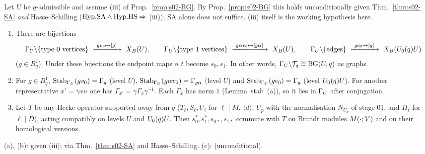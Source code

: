 \begin{proposition}\label{prop:s02-quot}
Let $U$ be $q$-admissible and assume (iii) of Prop.~\ref{prop:s02-BG}. By Prop.~\ref{prop:s02-BG} this holds
unconditionally given Thm.~\ref{thm:s02-SA} \emph{and} Hasse--Schilling ($\mathrm{Hyp.SA}\wedge\mathrm{Hyp.HS}\Rightarrow$ (iii)); SA alone does not suffice. (iii) itself is the working hypothesis here.
\begin{enumerate}[label=(\alph*)]
\item There are bijections
  \[\GU\backslash\{\text{type-}0\text{ vertices}\}\ \xrightarrow{\ gv_0\mapsto[g]\ }\ \XB{U},\qquad
    \GU\backslash\{\text{type-}1\text{ vertices}\}\ \xrightarrow{\ g\alpha v_0\mapsto[g\alpha]\ }\ \XB{U},\qquad
    \GU\backslash\{\text{edges}\}\ \xrightarrow{\ ge_0\mapsto[g]\ }\ \XB{\Uzero{q}U}\]
  ($g\in B^1_q$). Under these bijections the endpoint maps $o,t$ become $s_0,s_1$. In other words,
  $\Gamma_U\backslash\mathcal{T}_q\cong\mathrm{BG}(U,q)$ as graphs.
\item For $g\in B^1_q$, $\operatorname{Stab}_{\Gamma_U}(gv_0)=\Gamma_g$ (level $U$), $\operatorname{Stab}_{\Gamma_U}(g\alpha v_0)=\Gamma_{g\alpha}$
  (level $U$) and $\operatorname{Stab}_{\Gamma_U}(ge_0)=\Gamma_g$ (level $U_0(q)U$). For another representative
  $x'=\gamma xu$ one has $\Gamma_{x'}=\gamma\Gamma_x\gamma^{-1}$. Each $\Gamma_x$ has norm $1$
  (Lemma~stab~(a)), so it lies in $\Gamma_U$ after conjugation.
\item Let $T$ be any Hecke operator supported away from $q$ ($T_\ell,S_\ell,U_\ell$ for $\ell\mid M$,
  $\langle d\rangle$, $U_p$ with the normalisation $N_{U_p}$ of stage 01, and $\Pi_\ell$ for $\ell\mid D$),
  acting compatibly on levels $U$ and $U_0(q)U$. Then $s_0^*,s_1^*,s_{0*},s_{1*}$ commute with $T$ on
  Brandt modules $M(\cdot;V)$ and on their homological versions.
\end{enumerate}
(a), (b): \stproved{} given (iii); \stpmc{} via Thm.~\ref{thm:s02-SA} and Hasse--Schilling.
(c): \stproved{} (unconditional).
\end{proposition}

